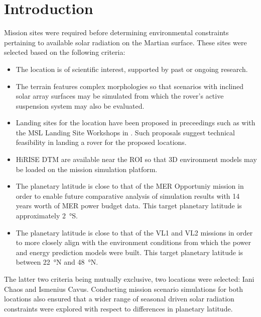 \section{Introduction}
\label{sec:MissionSites:Introduction}
Mission sites were required before determining environmental constraints pertaining to available solar radiation on the Martian surface. These sites were selected based on the following criteria:

\begin{itemize}
    \item The location is of scientific interest, supported by past or ongoing research.
    \item The terrain features complex morphologies so that scenarios with inclined solar array surfaces may be simulated from which the rover's active suspension system may also be evaluated.
    \item Landing sites for the location have been proposed in preceedings such as with the \ac{MSL} Landing Site Workshops in . Such proposals suggest technical feasibility in landing a rover for the proposed locations.
    \item \ac{HiRISE} \ac{DTM} are available near the \ac{ROI} so that 3D environment models may be loaded on the mission simulation platform.
    \item The planetary latitude is close to that of the \ac{MER} Opportuniy mission in order to enable future comparative analysis of simulation results with 14 years worth of \ac{MER} power budget data. This target planetary latitude is approximately \SI{2}{\degree}S.
    \item The planetary latitude is close to that of the \ac{VL1} and \ac{VL2} missions in order to more closely align with the environment conditions from which the power and energy prediction models were built. This target planetary latitude is between \SI{22}{\degree}N and \SI{48}{\degree}N.
\end{itemize}

The latter two criteria being mutually exclusive, two locations were selected: Iani Chaos and Ismenius Cavus. Conducting mission scenario simulations for both locations also ensured that a wider range of seasonal driven solar radiation constraints were explored with respect to differences in planetary latitude.

\clearpage
